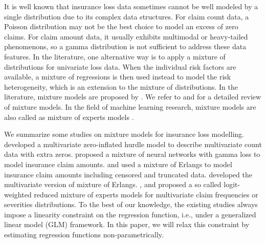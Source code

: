 \documentclass[11pt]{article}
\numberwithin{equation}{section}
\begin{document}
It is well known that insurance loss data sometimes cannot be well modeled by a single distribution due to its complex data structures.
For claim count data, a Poisson distribution may not be the best choice to model an excess of zero claims.
For claim amount data, it usually exhibits multimodal or heavy-tailed phenomenons, so a gamma distribution is not sufficient to address these data features.
In the literature, one alternative way is to apply a mixture of distributions for univariate loss data.
When the individual risk factors are available, a mixture of regressions is then used instead to model the risk heterogeneity, which is an extension to the mixture of distributions. 
In the literature,
mixture models are proposed by \citet{goldfeld1973markov}.
We refer to \citet{lindsay1995mixture} and \citet{peel2000finite} for a detailed review of mixture models.
In the field of machine learning research, mixture models are also called as mixture of experts models \citep{jacobs1991adaptive,jiang1999hierarchical}.

We summarize some studies on mixture models for insurance loss modelling.
\citet{zhang2020type, zhang2022new} developed a multivariate zero-inflated hurdle model to describe multivariate count data with extra zeros.
\citet{delong2021gamma} proposed a mixture of neural networks with gamma loss to model insurance claim amounts.
\citet{lee2010modeling} and \citet{verbelen2015fitting} used a mixture of Erlangs to model insurance claim amounts including censored and truncated data.
\citet{lee2012modeling} developed the multivariate version of mixture of Erlangs.
\citet{fung2019class2}, \citet{fung2019class} and \citet{tseung2021lrmoe} proposed a so called logit-weighted reduced mixture of experts models for multivariate claim frequencies or severities distributions.
To the best of our knowledge, the existing studies always impose a linearity constraint on the regression function, i.e., under a generalized linear model (GLM) framework.
In this paper, we will relax this constraint by estimating regression functions non-parametrically.
\end{document}

